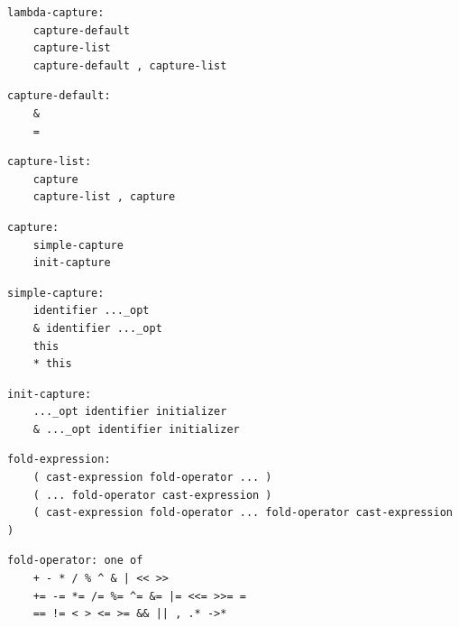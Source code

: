 \noindent\textbf{\texttt{}}\par
\begin{lstlisting}
lambda-capture:
    capture-default
    capture-list
    capture-default , capture-list
\end{lstlisting}

\noindent\textbf{\texttt{}}\par
\begin{lstlisting}
capture-default:
    &
    =
\end{lstlisting}

\noindent\textbf{\texttt{}}\par
\begin{lstlisting}
capture-list:
    capture
    capture-list , capture
\end{lstlisting}

\noindent\textbf{\texttt{}}\par
\begin{lstlisting}
capture:
    simple-capture
    init-capture
\end{lstlisting}

\noindent\textbf{\texttt{}}\par
\begin{lstlisting}
simple-capture:
    identifier ..._opt
    & identifier ..._opt
    this
    * this
\end{lstlisting}

\noindent\textbf{\texttt{}}\par
\begin{lstlisting}
init-capture:
    ..._opt identifier initializer
    & ..._opt identifier initializer
\end{lstlisting}

\noindent\textbf{\texttt{}}\par
\begin{lstlisting}
fold-expression:
    ( cast-expression fold-operator ... )
    ( ... fold-operator cast-expression )
    ( cast-expression fold-operator ... fold-operator cast-expression )
\end{lstlisting}

\noindent\textbf{\texttt{}}\par
\begin{lstlisting}
fold-operator: one of
    + - * / % ^ & | << >>
    += -= *= /= %= ^= &= |= <<= >>= =
    == != < > <= >= && || , .* ->*
\end{lstlisting}

